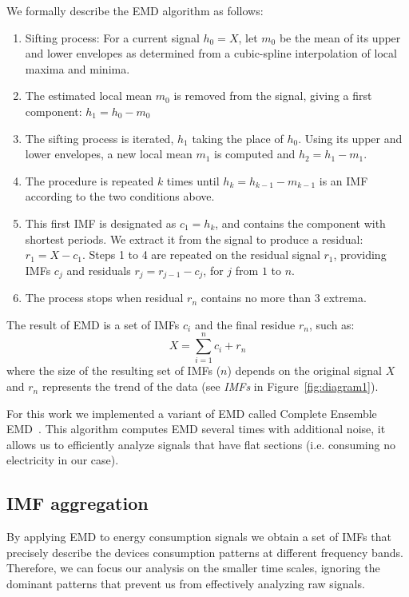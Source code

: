 We formally describe the EMD algorithm as follows: 
\begin{enumerate}
\item Sifting process: For a current signal $h_0=X$, let $m_0$ be the mean of its upper and lower envelopes as determined from a cubic-spline interpolation of local maxima and minima.
\item The estimated local mean $m_0$ is removed from the signal, giving a first component: $h_1 = h_0-m_0$
\item The sifting process is iterated, $h_1$ taking the place of $h_0$. Using its upper and lower envelopes, a new local mean $m_1$ is computed and $h_2 = h_1-m_1$.
\item The procedure is repeated $k$ times until $h_k=h_{k-1}-m_{k-1}$ is an IMF according to the two conditions above.
\item This first IMF is designated as $c_1 = h_k$, and contains the component with shortest periods. We extract it from the signal to produce a residual: $r_1 = X - c_1$.  Steps 1 to 4 are repeated on the residual signal $r_1$, providing IMFs $c_j$ and residuals $r_j  = r_{j-1}-c_j$, for $j$ from $1$ to $n$.
\item The process stops when residual $r_n$ contains no more than 3 extrema.
\end{enumerate}

The result of EMD is a set of IMFs $c_i$ and the final residue $r_n$, such as: \[X=\sum^{n}_{i=1}c_i+r_n\]
where the size of the resulting set of IMFs ($n$) depends on the original signal $X$ and $r_n$ represents the trend of 
the data (see \emph{IMFs} in Figure~\ref{fig:diagram1}).

For this work we implemented a variant of EMD called Complete Ensemble EMD~\cite{torres:icassp2012}.
This algorithm computes EMD several times with additional noise, it allows us to efficiently analyze signals that have 
flat sections (i.e. consuming no electricity in our case). %

\subsection{IMF aggregation} \label{methodo:corr}
By applying EMD to energy consumption signals we obtain a set of IMFs that precisely describe the devices consumption 
patterns at different frequency bands.  Therefore, we can focus our analysis on the smaller time scales, ignoring the dominant 
patterns that prevent us from effectively analyzing raw signals.

